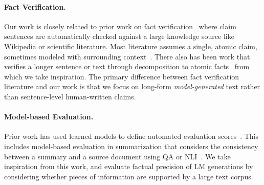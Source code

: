 \vspace{-.3em}
\paragraph{Fact Verification.} Our work is closely related to prior work on fact verification~\citep{thorne-etal-2018-fever,wadden-etal-2020-fact} where claim sentences are automatically checked against a large knowledge source like Wikipedia or scientific literature.
Most literature assumes a single, atomic claim, sometimes modeled with surrounding context~\citep{nakov2018overview, mihaylova2019semeval, shaar-etal-2022-role}.
There also has been work that verifies a longer sentence or text through decomposition to atomic facts~\citep{fan2020generating,wright-etal-2022-generating,chen2022generating,kamoi2023wice}
from which we take inspiration.
The primary difference between fact verification literature and our work is that we focus on long-form {\em model-generated} text rather than sentence-level human-written claims.

\vspace{-.3em}
\paragraph{Model-based Evaluation.}
Prior work has used learned models to define automated evaluation scores~\citep{zhang2019bertscore,liu2023gpteval}.
This includes model-based evaluation in summarization that considers the consistency between a summary and a source document using QA or NLI~\citep{kryscinski2019evaluating,wang2020asking,fabbri2021qafacteval,deutsch2021towards,laban2022summac}.
We take inspiration from this work, and evaluate factual precision of LM generations by considering whether pieces of information are supported by a large text corpus.



